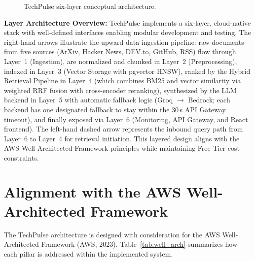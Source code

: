 \begin{figure}[H]
{%
}
\caption{TechPulse six-layer conceptual architecture.}
\label{fig:six_layers}
\end{figure}

\textbf{Layer Architecture Overview:}
TechPulse implements a six-layer, cloud-native stack with well-defined interfaces enabling modular development and testing. The right-hand arrows illustrate the upward data ingestion pipeline: raw documents from five sources (ArXiv, Hacker News, DEV.to, GitHub, RSS) flow through Layer~1 (Ingestion), are normalized and chunked in Layer~2 (Preprocessing), indexed in Layer~3 (Vector Storage with pgvector HNSW), ranked by the Hybrid Retrieval Pipeline in Layer~4 (which combines BM25 and vector similarity via weighted RRF fusion with cross-encoder reranking), synthesized by the LLM backend in Layer~5 with automatic fallback logic (Groq $\to$ Bedrock; each backend has one designated fallback to stay within the 30\,s API Gateway timeout), and finally exposed via Layer~6 (Monitoring, API Gateway, and React frontend). The left-hand dashed arrow represents the inbound query path from Layer~6 to Layer~4 for retrieval initiation. This layered design aligns with the AWS Well-Architected Framework principles while maintaining Free Tier cost constraints.

\section{Alignment with the AWS Well-Architected Framework}
\label{sec:well_architected}

The TechPulse architecture is designed with consideration for the AWS Well-Architected Framework (AWS, 2023). Table~\ref{tab:well_arch} summarizes how each pillar is addressed within the implemented system.

